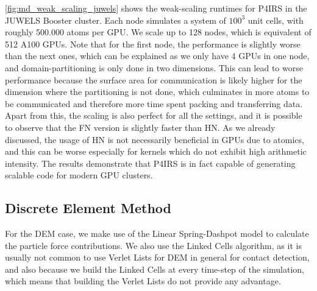 \documentclass[Afour,sageh,times]{sagej}
\begin{document}
\autoref{fig:md_weak_scaling_juwels} shows the weak-scaling runtimes for P4IRS in the JUWELS Booster cluster.
Each node simulates a system of $100^3$ unit cells, with roughly 500.000 atoms per GPU.
We scale up to 128 nodes, which is equivalent of 512 A100 GPUs.
Note that for the first node, the performance is slightly worse than the next ones, which can be explained as we only have 4 GPUs in one node, and domain-partitioning is only done in two dimensions.
This can lead to worse performance because the surface area for communication is likely higher for the dimension where the partitioning is not done, which culminates in more atoms to be communicated and therefore more time spent packing and transferring data.
Apart from this, the scaling is also perfect for all the settings, and it is possible to observe that the \ac{FN} version is slightly faster than \ac{HN}.
As we already discussed, the usage of \ac{HN} is not necessarily beneficial in GPUs due to atomics, and this can be worse especially for kernels which do not exhibit high arithmetic intensity.
The results demonstrate that P4IRS is in fact capable of generating scalable code for modern GPU clusters.

\subsection{Discrete Element Method}

For the \ac{DEM} case, we make use of the Linear Spring-Dashpot model to calculate the particle force contributions.
We also use the Linked Cells algorithm, as it is usually not common to use Verlet Lists for \ac{DEM} in general for contact detection, and also because we build the Linked Cells at every time-step of the simulation, which means that building the Verlet Lists do not provide any advantage.

%

\end{document}
